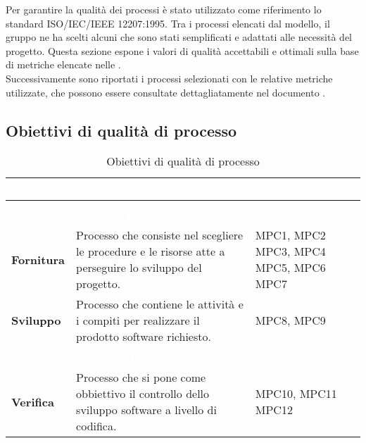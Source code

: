 
Per garantire la qualità dei processi è stato utilizzato come riferimento lo standard ISO/IEC/IEEE 12207:1995. Tra i processi elencati dal modello, il gruppo ne ha scelti alcuni che sono stati semplificati e adattati alle necessità del progetto. Questa sezione espone i valori di qualità accettabili e ottimali sulla base di metriche elencate nelle \NdP{}.\\ Successivamente sono riportati i processi selezionati con le relative metriche utilizzate, che possono essere consultate dettagliatamente nel documento .

\subsection{Obiettivi di qualità di processo}
{
\setlength\arrayrulewidth{0.95pt}
\renewcommand{\arraystretch}{1.5}
\begin{longtable}{C{3cm} | C{9.5cm} | C{2.5cm}}

\textcolor{white}{\textbf{Processo}}&
\textcolor{white}{\textbf{Descrizione}}&
\textcolor{white}{\textbf{Metriche}} \\
\endfirsthead
{}\\
\endfoot
{}\caption{Obiettivi di qualità di processo}
\endlastfoot
	
 & \textcolor{white}{\textbf{Processi primari}} &  \\

	\textbf{Fornitura} &
	 Processo che consiste nel scegliere le procedure e le risorse atte a perseguire lo sviluppo del progetto. &
	MPC1, MPC2 \newline MPC3, MPC4 \newline MPC5, MPC6 \newline MPC7  \\
	
		\textbf{Sviluppo} &
	 Processo che contiene le attività e i compiti per realizzare il prodotto software richiesto. &
	MPC8, MPC9 \\
 
 & \textcolor{white}{\textbf{Processi di supporto}} &  \\
 
	\textbf{Verifica} & 
	Processo che si pone come obbiettivo il controllo dello sviluppo software a livello di codifica. &
	MPC10, MPC11 \newline MPC12 \\
	

\end{longtable}}
